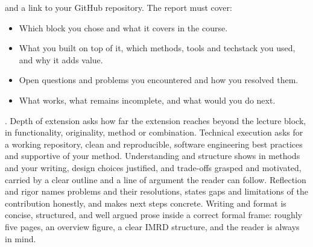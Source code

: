  and a link to your GitHub repository. The report must cover:
\begin{itemize}
    \item Which block you chose and what it covers in the course.
    \item What you built on top of it, which methods, tools and techstack you used, and why it adds value.
    \item Open questions and problems you encountered and how you resolved them.
    \item What works, what remains incomplete, and what would you do next.
\end{itemize}

\newpage
{}.
Depth of extension asks how far the extension reaches beyond the lecture block,
in functionality, originality, method or combination.
Technical execution asks for a working repository, clean and reproducible, software engineering best practices and 
supportive of your method.
Understanding and structure shows in methods and your writing, design choices justified,
and trade-offs grasped and motivated, carried by a clear outline and a line of argument 
the reader can follow.
Reflection and rigor names problems and their resolutions, states gaps and limitations of the contribution honestly,
and makes next steps concrete.
Writing and format is concise, structured, and well argued prose
inside a correct formal frame: roughly five pages, an overview figure, a clear IMRD structure, and the reader
is always in mind.


